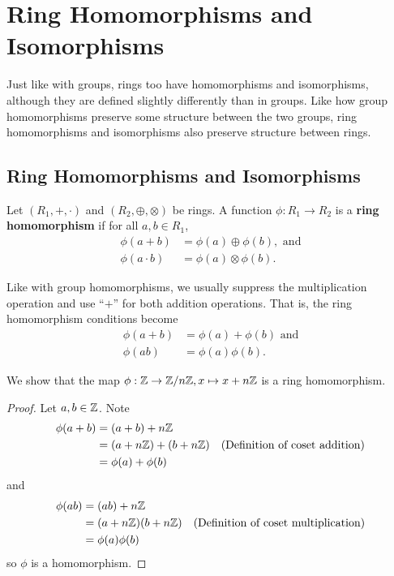 \chapter{Ring Homomorphisms and Isomorphisms}
Just like with groups, rings too have homomorphisms and isomorphisms, although they are defined slightly differently than in groups. Like how group homomorphisms preserve some structure between the two groups, ring homomorphisms and isomorphisms also preserve structure between rings.

\section{Ring Homomorphisms and Isomorphisms}
\begin{definition}
    Let $(R_1, +, \cdot)$ and $(R_2, \oplus, \otimes)$ be rings. A function $\phi: R_1 \to R_2$ is a \textbf{ring homomorphism} if for all $a, b \in R_1$,
    \begin{align*}
        \phi(a+b) &= \phi(a) \oplus \phi(b), \text{ and}\\
        \phi(a\cdot b) &= \phi(a)\otimes\phi(b).
    \end{align*}
\end{definition}
\begin{remark}
    Like with group homomorphisms, we usually suppress the multiplication operation and use ``$+$'' for both addition operations. That is, the ring homomorphism conditions become
    \begin{align*}
        \phi(a+b) &= \phi(a) + \phi(b) \text{ and}\\
        \phi(ab) &= \phi(a)\phi(b).
    \end{align*}
\end{remark}

\begin{example}
    We show that the map $\phi: \mathbb{Z} \to \mathbb{Z}/n\mathbb{Z}, x \mapsto x + n\mathbb{Z}$ is a ring homomorphism.
     
    \begin{proof}
        Let $a, b \in \mathbb{Z}$. Note
        \begin{align*}
            \phi(a+b) &= (a+b) + n\mathbb{Z}\\
            &= (a + n\mathbb{Z}) + (b + n\mathbb{Z}) & (\text{Definition of coset addition})\\
            &=\phi(a)+\phi(b)
        \end{align*}
        and
        \begin{align*}
            \phi(ab) &= (ab) + n\mathbb{Z}\\
            &= (a + n\mathbb{Z})(b + n\mathbb{Z}) & (\text{Definition of coset multiplication})\\
            &= \phi(a)\phi(b)
        \end{align*}
        so $\phi$ is a homomorphism.
    \end{proof}
\end{example}

